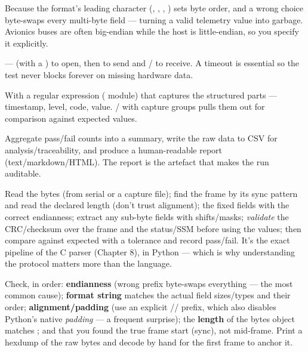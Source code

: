Because the format's leading character (\code{>}, \code{<}, \code{!}, \code{=})
sets byte order, and a wrong choice byte-swaps every multi-byte field ---
turning a valid telemetry value into garbage. Avionics buses are often
big-endian while the host is little-endian, so you specify it explicitly.

 ---  (with a ) to open, then
 to send and  /  to receive. A timeout is
essential so the test never blocks forever on missing hardware data.

With a regular expression ( module) that captures the structured parts
--- timestamp, level, code, value. / with capture
groups pulls them out for comparison against expected values.

Aggregate pass/fail counts into a summary, write the raw data to CSV for
analysis/traceability, and produce a human-readable report (text/markdown/HTML).
The report is the artefact that makes the run auditable.


Read the bytes (from serial or a capture file); find the frame by its sync
pattern and read the declared length (don't trust alignment); 
the fixed fields with the correct endianness; extract any sub-byte fields with
shifts/masks; \emph{validate} the CRC/checksum over the frame and the status/SSM
before using the values; then compare against expected with a tolerance and
record pass/fail. It's the exact pipeline of the C parser (Chapter 8), in Python
--- which is why understanding the protocol matters more than the language.

Check, in order: \textbf{endianness} (wrong prefix byte-swaps everything ---
the most common cause); \textbf{format string} matches the actual field
sizes/types and their order; \textbf{alignment/padding} (use an explicit
\code{>}/\code{<}/\code{!} prefix, which also disables Python's native
\emph{padding} --- a frequent surprise); the \textbf{length} of the bytes object
matches ; and that you found the true frame start
(sync), not mid-frame. Print a hexdump of the raw bytes and decode by hand for
the first frame to anchor it.

